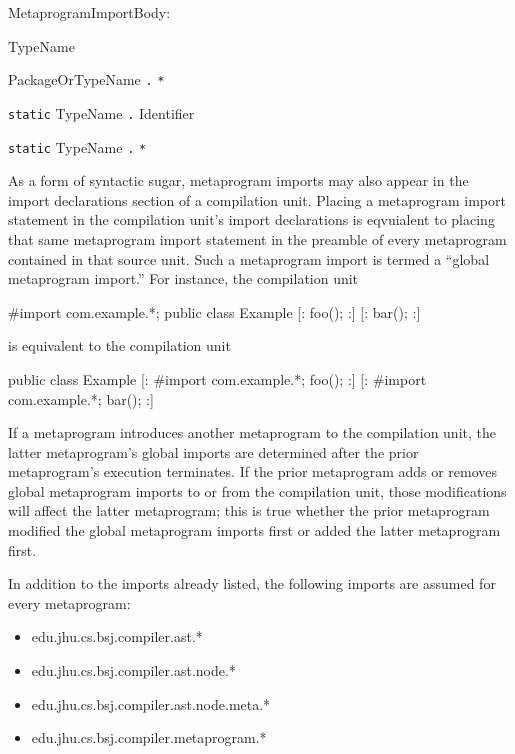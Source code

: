 \documentclass[a4paper,10pt]{report}
\newenvironment{code}{\small\verbatim}{\endverbatim}
\newenvironment{grammar}{
    \begin{list}{}{
        \itshape
        \setlength{\partopsep}{\topsep}
        \setlength{\topsep}{0cm}
    }
}{
    \end{list}
}
\begin{document}
\begin{grammar}
    \item MetaprogramImportBody:
    \begin{grammar}
        \item TypeName
        \item PackageOrTypeName \verb`.` \verb`*`
        \item \verb`static` TypeName \verb`.` Identifier
        \item \verb`static` TypeName \verb`.` \verb`*`
    \end{grammar}
\end{grammar}

As a form of syntactic sugar, metaprogram imports may also appear in the import declarations section of a compilation unit.  Placing a metaprogram import statement in the compilation unit's import declarations is eqvuialent to placing that same metaprogram import statement in the preamble of every metaprogram contained in that source unit.  Such a metaprogram import is termed a ``global metaprogram import.''  For instance, the compilation unit

\begin{code}
#import com.example.*;
public class Example {
    [:
        foo();
    :]
}
[:
    bar();
:]
\end{code}

is equivalent to the compilation unit

\begin{code}
public class Example {
    [:
        #import com.example.*;
        foo();
    :]
}
[:
    #import com.example.*;
    bar();
:]
\end{code}

If a metaprogram introduces another metaprogram to the compilation unit, the latter metaprogram's global imports are determined after the prior metaprogram's execution terminates.  If the prior metaprogram adds or removes global metaprogram imports to or from the compilation unit, those modifications will affect the latter metaprogram; this is true whether the prior metaprogram modified the global metaprogram imports first or added the latter metaprogram first.

In addition to the imports already listed, the following imports are assumed for every metaprogram:

{\ttfamily
\begin{itemize}
    \item edu.jhu.cs.bsj.compiler.ast.*
    \item edu.jhu.cs.bsj.compiler.ast.node.*
    \item edu.jhu.cs.bsj.compiler.ast.node.meta.*
    \item edu.jhu.cs.bsj.compiler.metaprogram.*
\end{itemize}
}
\end{document}
